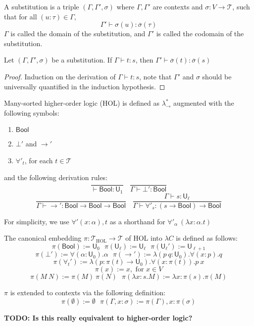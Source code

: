 \begin{definition} A substitution is a triple $(\Gamma, \Gamma', \sigma)$ where $\Gamma, \Gamma'$ are contexts
  and $\sigma : V \to \mathcal{T}$, such that for all $(u : \tau) \in \Gamma$,
  $$\Gamma' \vdash \sigma(u) : \overline{\sigma}(\tau)$$
  $\Gamma$ is called the domain of the substitution, and $\Gamma'$ is called the codomain of the substitution.
\end{definition}

\begin{theorem}
  Let $(\Gamma, \Gamma', \sigma)$ be a substitution. If $\Gamma \vdash t : s$, then $\Gamma' \vdash \overline{\sigma}(t) : \overline{\sigma}(s)$
\end{theorem}
\begin{proof} Induction on the derivation of $\Gamma \vdash t : s$, note that $\Gamma'$ and $\sigma$
  should be universally quantified in the induction hypothesis.
\end{proof}

\begin{definition} Many-sorted higher-order logic (HOL) is defined as $\lambda_\to^*$ augmented
  with the following symbols:
  \begin{enumerate}
    \item $\mathsf{Bool}$
    \item $\bot'$ and $\to'$
    \item $\forall'_t$, for each $t \in \mathcal{T}$
  \end{enumerate}
  
  \noindent and the following derivation rules:
  $$\frac{}{\vdash \mathsf{Bool} : \mathsf{U}_1} \ \ \ \ \frac{}{\Gamma \vdash \bot' : \mathsf{Bool}}$$
  $$\frac{}{\Gamma \vdash \to' : \mathsf{Bool} \to \mathsf{Bool} \to \mathsf{Bool}} \ \ \ \
  \frac{\Gamma \vdash s : \mathsf{U}_\ell}{\Gamma \vdash \forall'_s : (s \to \mathsf{Bool}) \to \mathsf{Bool}}$$
  
  \noindent For simplicity, we use $\forall' (x : \alpha), t$ as a shorthand for $\forall'_\alpha \ (\lambda x : \alpha. t)$

  \noindent The canonical embedding $\pi : \mathcal{T}_{\text{HOL}} \to \mathcal{T}$ of HOL into $\lambda C$ is defined as follows:
  $$\pi(\mathsf{Bool}) := \mathsf{U}_0 \ \ \ \pi(\mathsf{U}_\ell) := \mathsf{U}_\ell \ \ \
    \pi(\mathsf{U}_\ell') := \mathsf{U}_{\ell + 1}$$
  $$\pi(\bot') := \forall (\alpha : \mathsf{U}_0). \alpha \ \ \
  \pi(\to') := \lambda (p \ q : \mathsf{U}_0). \forall (x : p). q$$
  $$\pi(\forall_t') := \lambda (p : \pi(t) \to \mathsf{U}_0). \forall (x : \pi(t)). p \ x$$
  $$\pi(x) := x, \text{ for } x \in V$$
  $$\pi(M \ N) := \pi(M) \ \pi(N) \ \ \ \pi(\lambda x : s. M) := \lambda x : \pi(s). \pi(M)$$

  \noindent $\pi$ is extended to contexts via the following definition:
  $$\pi(\emptyset) := \emptyset \ \ \ \pi(\Gamma, x : \sigma) := \pi(\Gamma), x : \pi(\sigma)$$

  \noindent \textbf{TODO: Is this really equivalent to higher-order logic?}

\end{definition}

